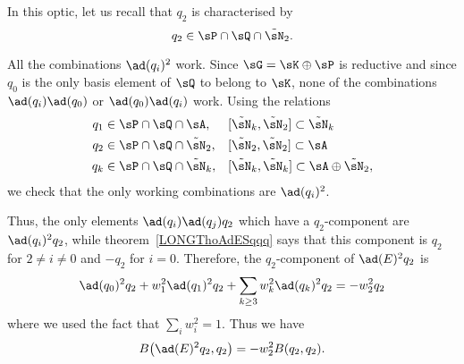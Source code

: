 In this optic, let us recall that $q_2$ is characterised by
\begin{equation}
    q_2\in\sP\cap\sQ\cap\tilde\sN_2.
\end{equation}

All the combinations $\ad(q_i)^2$ work. Since $\sG=\sK\oplus\sP$ is reductive and since $q_0$ is the only basis element of $\sQ$ to belong to $\sK$, none of the combinations $\ad(q_i)\ad(q_0)$ or $\ad(q_0)\ad(q_i)$ work. Using the relations
%
\begin{equation}
    \begin{aligned}[]
        q_1&\in\sP\cap\sQ\cap\sA    ,    &&    [\tilde\sN_k,\tilde\sN_2]\subset\tilde\sN_k\\
        q_2&\in\sP\cap\sQ\cap\tilde\sN_2,    &&    [\tilde\sN_2,\tilde\sN_2]\subset\sA\\
        q_k&\in\sP\cap\sQ\cap\tilde\sN_k,    &&    [\tilde\sN_k,\tilde\sN_k]\subset\sA\oplus\tilde\sN_2,
    \end{aligned}
\end{equation}%
%
we check that the only working combinations are $\ad(q_i)^2$.

%

%

%

%

Thus, the only elements $\ad(q_i)\ad(q_j)q_2$ which have a $q_2$-component are $\ad(q_i)^2q_2$, while theorem~\ref{LONGThoAdESqqq} says that this component is $q_2$ for $2\neq i\neq 0$ and $-q_2$ for $i=0$. Therefore, the $q_2$-component of $\ad(E)^2q_2$ is
\begin{equation}
    \ad(q_0)^2q_2+w_1^2\ad(q_1)^2q_2+\sum_{k\geq 3}w_k^2\ad(q_k)^2q_2=-w_2^2q_2
\end{equation}
where we used the fact that $\sum_i w_i^2=1$. Thus we have
\begin{equation}        \label{LONGEqBeDeuxqqwDeux}
    B\big( \ad(E)^2q_2,q_2 \big)=-w_2^2B(q_2,q_2).
\end{equation}

